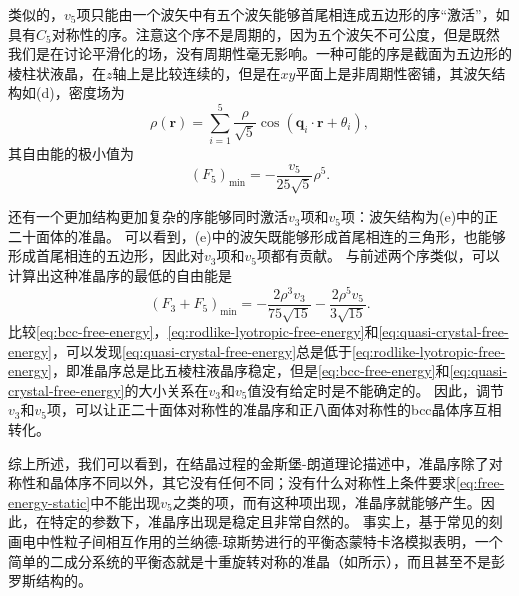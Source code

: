 \documentclass[hyperref, UTF8, a4paper]{ctexart}
\begin{document}
类似的，$v_5$项只能由一个波矢中有五个波矢能够首尾相连成五边形的序“激活”，如具有$C_5$对称性的序。注意这个序不是周期的，因为五个波矢不可公度，但是既然我们是在讨论平滑化的场，没有周期性毫无影响。一种可能的序是截面为五边形的棱柱状液晶，在$z$轴上是比较连续的，但是在$xy$平面上是非周期性密铺，其波矢结构如(d)，密度场为
\begin{equation}
    \rho(\boldsymbol{r})=\sum_{i=1}^{5} \frac{\rho}{\sqrt{5}} \cos \left(\boldsymbol{q}_{i} \cdot \boldsymbol{r}+\theta_{i}\right),
\end{equation}
其自由能的极小值为
\begin{equation}
    (F_{5})_\text{min} =-\frac{v_{5}}{25 \sqrt{5}} \rho^{5}.
    \label{eq:rodlike-lyotropic-free-energy}
\end{equation}

还有一个更加结构更加复杂的序能够同时激活$v_3$项和$v_5$项：波矢结构为(e)中的正二十面体的准晶。
可以看到，(e)中的波矢既能够形成首尾相连的三角形，也能够形成首尾相连的五边形，因此对$v_3$项和$v_5$项都有贡献。
与前述两个序类似，可以计算出这种准晶序的最低的自由能是
\begin{equation}
    \left(F_{3}+F_{5}\right)_{\min }=-\frac{2 \rho^{3} v_{3}}{75 \sqrt{15}}-\frac{2 \rho^{5} v_{5}}{3 \sqrt{15}}.
    \label{eq:quasi-crystal-free-energy}
\end{equation}
比较\eqref{eq:bcc-free-energy}，\eqref{eq:rodlike-lyotropic-free-energy}和\eqref{eq:quasi-crystal-free-energy}，可以发现\eqref{eq:quasi-crystal-free-energy}总是低于\eqref{eq:rodlike-lyotropic-free-energy}，即准晶序总是比五棱柱液晶序稳定，但是\eqref{eq:bcc-free-energy}和\eqref{eq:quasi-crystal-free-energy}的大小关系在$v_3$和$v_5$值没有给定时是不能确定的。
因此，调节$v_3$和$v_5$项，可以让正二十面体对称性的准晶序和正八面体对称性的bcc晶体序互相转化。

综上所述，我们可以看到，在结晶过程的金斯堡-朗道理论描述中，准晶序除了对称性和晶体序不同以外，其它没有任何不同；没有什么对称性上条件要求\eqref{eq:free-energy-static}中不能出现$v_5$之类的项，而有这种项出现，准晶序就能够产生。因此，在特定的参数下，准晶序出现是稳定且非常自然的。
事实上，基于常见的刻画电中性粒子间相互作用的兰纳德-琼斯势进行的平衡态蒙特卡洛模拟表明，一个简单的二成分系统的平衡态就是十重旋转对称的准晶（如所示），而且甚至不是彭罗斯结构的\cite{PhysRevLett.58.706}。
\end{document}
